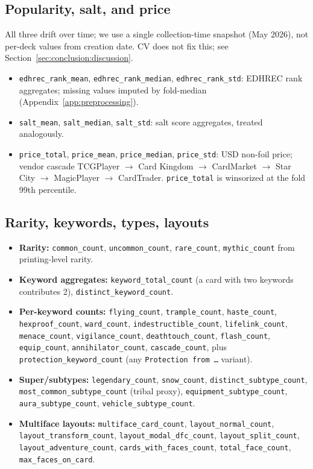\documentclass{article}
\begin{document}
\subsection{Popularity, salt, and price}
\label{app:features:popularity}
All three drift over time; we use a single collection-time snapshot (May 2026), not per-deck values from creation date. CV does not fix this; see Section~\ref{sec:conclusion:discussion}.
\begin{itemize}\itemsep0pt
  \item \texttt{edhrec\_rank\_mean}, \texttt{edhrec\_rank\_median}, \texttt{edhrec\_rank\_std}: EDHREC rank aggregates; missing values imputed by fold-median (Appendix~\ref{app:preprocessing}).
  \item \texttt{salt\_mean}, \texttt{salt\_median}, \texttt{salt\_std}: salt score aggregates, treated analogously.
  \item \texttt{price\_total}, \texttt{price\_mean}, \texttt{price\_median}, \texttt{price\_std}: USD non-foil price; vendor cascade TCGPlayer $\to$ Card Kingdom $\to$ CardMarket $\to$ Star City $\to$ MagicPlayer $\to$ CardTrader. \texttt{price\_total} is winsorized at the fold 99th percentile.
\end{itemize}

\subsection{Rarity, keywords, types, layouts}
\label{app:features:rest}
\begin{itemize}\itemsep0pt
  \item \textbf{Rarity:} \texttt{common\_count}, \texttt{uncommon\_count}, \texttt{rare\_count}, \texttt{mythic\_count} from printing-level rarity.
  \item \textbf{Keyword aggregates:} \texttt{keyword\_total\_count} (a card with two keywords contributes 2), \texttt{distinct\_keyword\_count}.
  \item \textbf{Per-keyword counts:} \texttt{flying\_count}, \texttt{trample\_count}, \texttt{haste\_count}, \texttt{hexproof\_count}, \texttt{ward\_count}, \texttt{indestructible\_count}, \texttt{lifelink\_count}, \texttt{menace\_count}, \texttt{vigilance\_count}, \texttt{deathtouch\_count}, \texttt{flash\_count}, \texttt{equip\_count}, \texttt{annihilator\_count}, \texttt{cascade\_count}, plus \texttt{protection\_keyword\_count} (any \texttt{Protection from \dots} variant).
  \item \textbf{Super/subtypes:} \texttt{legendary\_count}, \texttt{snow\_count}, \texttt{distinct\_subtype\_count}, \texttt{most\_common\_subtype\_count} (tribal proxy), \texttt{equipment\_subtype\_count}, \texttt{aura\_subtype\_count}, \texttt{vehicle\_subtype\_count}.
  \item \textbf{Multiface layouts:} \texttt{multiface\_card\_count}, \texttt{layout\_normal\_count}, \texttt{layout\_transform\_count}, \texttt{layout\_modal\_dfc\_count}, \texttt{layout\_split\_count}, \texttt{layout\_adventure\_count}, \texttt{cards\_with\_faces\_count}, \texttt{total\_face\_count}, \texttt{max\_faces\_on\_card}.
\end{itemize}
\end{document}

